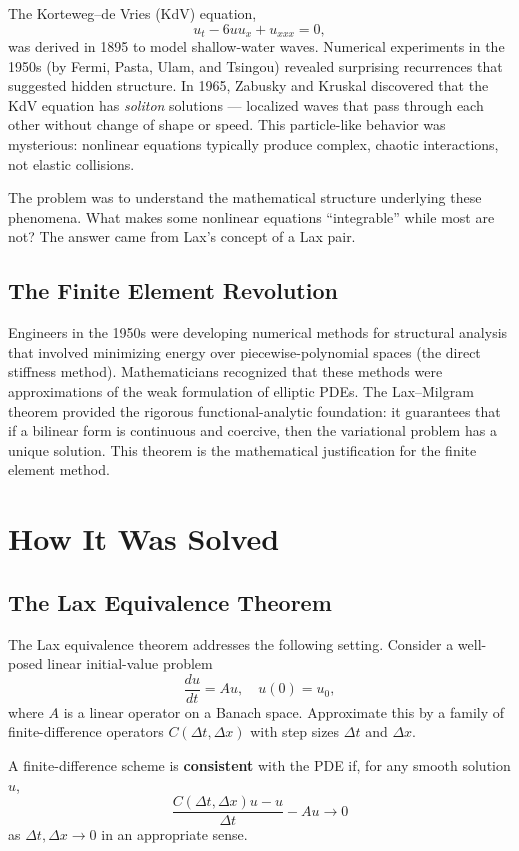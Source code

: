 The Korteweg--de Vries (KdV) equation,
\[
u_t - 6 u u_x + u_{xxx} = 0,
\]
was derived in 1895 to model shallow-water waves. Numerical experiments in the 1950s (by Fermi, Pasta, Ulam, and Tsingou) revealed surprising recurrences that suggested hidden structure. In 1965, Zabusky and Kruskal discovered that the KdV equation has \textit{soliton} solutions --- localized waves that pass through each other without change of shape or speed. This particle-like behavior was mysterious: nonlinear equations typically produce complex, chaotic interactions, not elastic collisions.

The problem was to understand the mathematical structure underlying these phenomena. What makes some nonlinear equations ``integrable'' while most are not? The answer came from Lax's concept of a Lax pair.

\subsection{The Finite Element Revolution}

Engineers in the 1950s were developing numerical methods for structural analysis that involved minimizing energy over piecewise-polynomial spaces (the direct stiffness method). Mathematicians recognized that these methods were approximations of the weak formulation of elliptic PDEs. The Lax--Milgram theorem provided the rigorous functional-analytic foundation: it guarantees that if a bilinear form is continuous and coercive, then the variational problem has a unique solution. This theorem is the mathematical justification for the finite element method.

\section{How It Was Solved}

\subsection{The Lax Equivalence Theorem}

The Lax equivalence theorem addresses the following setting. Consider a well-posed linear initial-value problem
\[
\frac{du}{dt} = A u, \quad u(0) = u_0,
\]
where \(A\) is a linear operator on a Banach space. Approximate this by a family of finite-difference operators \(C(\Delta t, \Delta x)\) with step sizes \(\Delta t\) and \(\Delta x\).

\begin{definition}[Consistency]
A finite-difference scheme is \textbf{consistent} with the PDE if, for any smooth solution \(u\),
\[
\frac{C(\Delta t, \Delta x) u - u}{\Delta t} - A u \to 0
\]
as \(\Delta t, \Delta x \to 0\) in an appropriate sense.
\end{definition}

